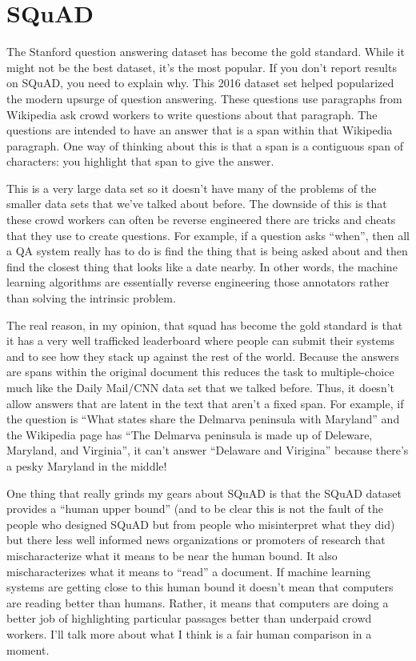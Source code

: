 \section{SQuAD}

The Stanford question answering dataset has become the gold standard.  While it might not be the best dataset, it’s the most popular.  If you don't report results on SQuAD, you need to explain why.  This 2016 dataset set helped popularized the modern upsurge of question answering.  These questions use paragraphs from Wikipedia ask crowd workers to write questions about that paragraph.  The questions are intended to have an answer that is a span within that Wikipedia paragraph.  One way of thinking about this is that a span is a contiguous span of characters: you highlight that span to give the answer.

This is a very large data set so it doesn't have many of the problems of the smaller data sets that we've talked about before. The downside of this is that these crowd workers can often be reverse engineered there are tricks and cheats that they use to create questions.  For example, if a question asks “when”, then all a QA system really has to do is find the thing that is being asked about and then find the closest thing that looks like a date nearby.  In other words, the machine learning algorithms are essentially reverse engineering those annotators rather than solving the intrinsic problem.

The real reason, in my opinion, that squad has become the gold standard is that it has a very well trafficked leaderboard where people can submit their systems and to see how they stack up against the rest of the world.  Because the answers are spans within the original document this reduces the task to multiple-choice much like the Daily Mail/CNN data set that we talked before.  Thus, it doesn't allow answers that are latent in the text that aren’t a fixed span.  For example, if the question is “What states share the Delmarva peninsula with Maryland” and the Wikipedia page has “The Delmarva peninsula is made up of Deleware, Maryland, and Virginia”, it can’t answer “Delaware and Virigina” because there’s a pesky Maryland in the middle!

One thing that really grinds my gears about SQuAD is that the SQuAD dataset provides a “human upper bound” (and to be clear this is not the fault of the people who designed SQuAD but from people who misinterpret what they did) but there less well informed news organizations or promoters of research that mischaracterize what it means to be near the human bound.  It also mischaracterizes what it means to “read” a document.  If machine learning systems are getting close to this human bound it doesn't mean that computers are reading better than humans.  Rather, it means that computers are doing a better job of highlighting particular passages better than underpaid crowd workers.  I’ll talk more about what I think is a fair human comparison in a moment.

